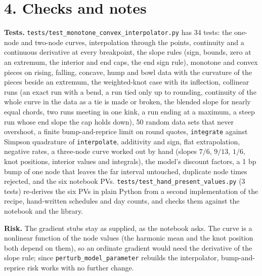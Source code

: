 \documentclass[10pt]{article}
\newcommand{\code}[1]{\texttt{#1}}
\begin{document}
\section*{4. Checks and notes}
\textbf{Tests.} \code{tests/test\_monotone\_convex\_interpolator.py} has 34 tests: the one-node and two-node curves, interpolation
through the points, continuity and a continuous derivative at every breakpoint, the slope rules (sign, bounds, zero at an extremum, the
interior and end caps, the end sign rule), monotone and convex pieces on rising, falling, concave, hump and bowl data with the curvature
of the pieces beside an extremum, the weighted-knot case with its inflection, collinear runs (an exact run with a bend, a run tied only
up to rounding, continuity of the whole curve in the data as a tie is made or broken, the blended slope for nearly equal chords, two
runs meeting in one kink, a run ending at a maximum, a steep run whose end slope the cap holds down), 50 random data sets that never
overshoot, a finite bump-and-reprice limit on round quotes, \code{integrate} against Simpson quadrature of
\code{interpolate}, additivity and sign, flat extrapolation, negative rates, a three-node curve worked out by hand (slopes $7/6$, $9/13$,
$1/6$, knot positions, interior values and integrals), the model's discount factors, a 1 bp bump of one node that leaves the far
interval untouched, duplicate node times rejected, and the six notebook PVs. \code{tests/test\_hand\_present\_values.py} (3
tests) re-derives the six PVs in plain Python from a second implementation of the recipe, hand-written schedules and day counts, and
checks them against the notebook and the library.

\textbf{Risk.} The gradient stubs stay as supplied, as the notebook asks. The curve is a nonlinear function of the node values (the
harmonic mean and the knot position both depend on them), so an ordinate gradient would need the derivative of the slope rule; since
\code{perturb\_model\_parameter} rebuilds the interpolator, bump-and-reprice risk works with no further change.
\end{document}
